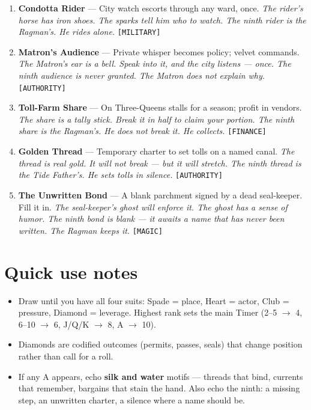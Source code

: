 \begin{enumerate}
\item \textbf{Condotta Rider} --- City watch escorts through any ward, once.
  \hfill \textit{The rider's horse has iron shoes. The sparks tell him who to watch. The ninth rider is the Ragman's. He rides alone.} \texttt{[MILITARY]}
\item[J] \textbf{Matron's Audience} --- Private whisper becomes policy; velvet commands.
  \hfill \textit{The Matron's ear is a bell. Speak into it, and the city listens --- once. The ninth audience is never granted. The Matron does not explain why.} \texttt{[AUTHORITY]}
\item[Q] \textbf{Toll-Farm Share} --- On Three-Queens stalls for a season; profit in vendors.
  \hfill \textit{The share is a tally stick. Break it in half to claim your portion. The ninth share is the Ragman's. He does not break it. He collects.} \texttt{[FINANCE]}
\item[K] \textbf{Golden Thread} --- Temporary charter to set tolls on a named canal.
  \hfill \textit{The thread is real gold. It will not break --- but it will stretch. The ninth thread is the Tide Father's. He sets tolls in silence.} \texttt{[AUTHORITY]}
\item[A] \textbf{The Unwritten Bond} --- A blank parchment signed by a dead seal-keeper. Fill it in.
  \hfill \textit{The seal-keeper's ghost will enforce it. The ghost has a sense of humor. The ninth bond is blank --- it awaits a name that has never been written. The Ragman keeps it.} \texttt{[MAGIC]}
\end{enumerate}

\section*{Quick use notes}
\label{sec:silkstrand-quick-use}
\begin{itemize}
\item Draw until you have all four suits: Spade = place, Heart = actor, Club = pressure, Diamond = leverage. Highest rank sets the main Timer (2--5 $\rightarrow$ 4, 6--10 $\rightarrow$ 6, J/Q/K $\rightarrow$ 8, A $\rightarrow$ 10).
\item Diamonds are codified outcomes (permits, passes, seals) that change position rather than call for a roll.
\item If any A appears, echo \textbf{silk and water} motifs --- threads that bind, currents that remember, bargains that stain the hand. Also echo the ninth: a missing step, an unwritten charter, a silence where a name should be.
\end{itemize}

